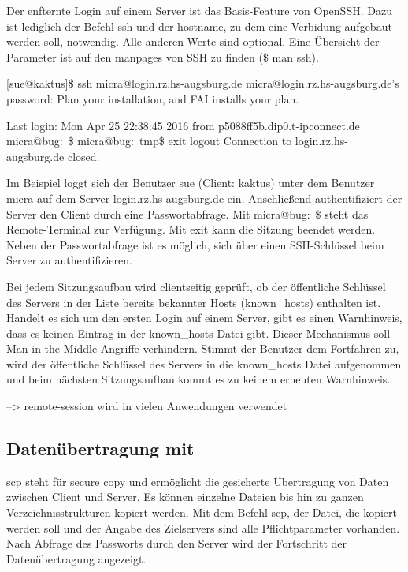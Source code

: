 \documentclass[ngerman,pdf]{wkcms}    %
\begin{document}
Der enfternte Login auf einem Server ist das Basis-Feature von OpenSSH.
Dazu ist lediglich der Befehl \IT ssh und der \IT hostname, zu dem eine Verbidung aufgebaut werden soll, notwendig. Alle anderen Werte sind optional.
Eine Übersicht der Parameter ist auf den manpages von SSH zu finden
(\$ man ssh).

\begin{program}

[sue@kaktus]\$ ssh micra@login.rz.hs-augsburg.de
micra@login.rz.hs-augsburg.de's password:
Plan your installation, and FAI installs your plan.

Last login: Mon Apr 25 22:38:45 2016
from p5088ff5b.dip0.t-ipconnect.de
micra@bug:~\$
micra@bug:~\/tmp\$ exit
logout
Connection to login.rz.hs-augsburg.de closed.

\end{program}

Im Beispiel loggt sich der Benutzer \IT sue (Client: \IT kaktus) unter dem Benutzer \IT micra auf dem Server \IT login.rz.hs-augsburg.de ein. Anschließend authentifiziert der Server den Client durch eine Passwortabfrage. Mit \IT micra@bug:~\$ steht das Remote-Terminal zur Verfügung. Mit \IT exit kann die Sitzung beendet werden. Neben der Passwortabfrage ist es möglich, sich über einen SSH-Schlüssel beim Server zu authentifizieren.

Bei jedem Sitzungsaufbau wird clientseitig geprüft, ob der öffentliche Schlüssel des Servers in der Liste bereits bekannter Hosts (\IT known\_hosts) enthalten ist. Handelt es sich um den ersten Login auf einem Server, gibt es einen Warnhinweis, dass es keinen Eintrag in der known\_hosts Datei gibt. Dieser Mechanismus soll Man-in-the-Middle Angriffe verhindern. Stimmt der Benutzer dem Fortfahren zu, wird der öffentliche Schlüssel des Servers in die \IT known\_hosts Datei aufgenommen und beim nächsten Sitzungsaufbau kommt es zu keinem erneuten Warnhinweis. \cite[S. 25]{SSH}

--> remote-session wird in vielen Anwendungen verwendet

\subsection{Datenübertragung mit }

\IT scp steht für \IT secure \IT copy und ermöglicht die gesicherte Übertragung von Daten zwischen Client und Server. Es können einzelne Dateien bis hin zu ganzen Verzeichnisstrukturen kopiert werden. \cite[S. 80]{openssh_book} Mit dem Befehl \IT scp, der Datei, die kopiert werden soll und der Angabe des Zielservers sind alle Pflichtparameter vorhanden. Nach Abfrage des Passworts durch den Server wird der Fortschritt der Datenübertragung angezeigt.
\end{document}
